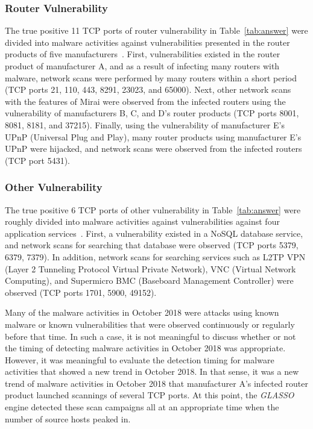 \documentclass[conference]{IEEEtran}
\begin{document}
\subsubsection{Router Vulnerability}
The true positive 11 TCP ports of router vulnerability in Table~\ref{tab:answer} were divided into malware activities against vulnerabilities presented in the router products of five manufacturers~\cite{Huawei,Netlab_BCM,Netlab_MikroTik}.
First, vulnerabilities existed in the router product of manufacturer A, and as a result of infecting many routers with malware, network scans were performed by many routers within a short period (TCP ports 21, 110, 443, 8291, 23023, and 65000).
Next, other network scans with the features of Mirai were observed from the infected routers using the vulnerability of manufacturers B, C, and D's router products (TCP ports 8001, 8081, 8181, and 37215).
Finally, using the vulnerability of manufacturer E's UPnP (Universal Plug and Play), many router products using manufacturer E's UPnP were hijacked, and network scans were observed from the infected routers (TCP port 5431).



\subsubsection{Other Vulnerability}
The true positive 6 TCP ports of other vulnerability in Table~\ref{tab:answer} were roughly divided into malware activities against vulnerabilities against four application services~\cite{Imperva}.
First, a vulnerability existed in a NoSQL database service, and network scans for searching that database were observed (TCP ports 5379, 6379, 7379).
In addition, network scans for searching services such as L2TP VPN (Layer 2 Tunneling Protocol Virtual Private Network), VNC (Virtual Network Computing), and Supermicro BMC (Baseboard Management Controller) were observed (TCP ports 1701, 5900, 49152).


Many of the malware activities in October 2018 were attacks using known malware or known vulnerabilities that were observed continuously or regularly before that time.
In such a case, it is not meaningful to discuss whether or not the timing of detecting malware activities in October 2018 was appropriate.
However, it was meaningful to evaluate the detection timing for malware activities that showed a new trend in October 2018.
In that sense, it was a new trend of malware activities in October 2018 that manufacturer A's infected router product launched scannings of several TCP ports.
At this point, the \textit{GLASSO} engine detected these scan campaigns all at an appropriate time when the number of source hosts peaked in.
\end{document}
